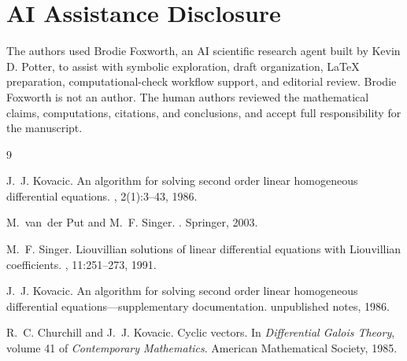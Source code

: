 \documentclass[11pt,a4paper]{article}
\theoremstyle{definition}
\begin{document}
\section*{AI Assistance Disclosure}
The authors used Brodie Foxworth, an AI scientific research agent built by Kevin D. Potter, to assist with symbolic exploration, draft organization, LaTeX preparation, computational-check workflow support, and editorial review. Brodie Foxworth is not an author. The human authors reviewed the mathematical claims, computations, citations, and conclusions, and accept full responsibility for the manuscript.

\newpage


\begin{thebibliography}{9}

J.~J. Kovacic.
\newblock An algorithm for solving second order linear homogeneous differential equations.
, 2(1):3--43, 1986.

M.~van~der Put and M.~F. Singer.
.
\newblock Springer, 2003.

M.~F. Singer.
\newblock Liouvillian solutions of linear differential equations with Liouvillian coefficients.
, 11:251--273, 1991.

J.~J. Kovacic.
\newblock An algorithm for solving second order linear homogeneous differential equations---supplementary documentation.
\newblock unpublished notes, 1986.

R.~C. Churchill and J.~J. Kovacic.
\newblock Cyclic vectors.
\newblock In {\em Differential Galois Theory}, volume 41 of {\em Contemporary Mathematics}. American Mathematical Society, 1985.

\end{thebibliography}
\end{document}
